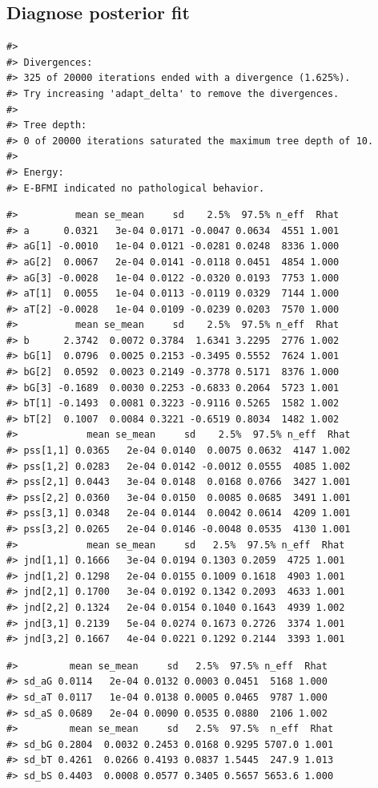 \documentclass[11pt, oneside, openany]{scrbook}
\begin{document}
\hypertarget{diagnose-posterior-fit}{%
\subsection{Diagnose posterior fit}\label{diagnose-posterior-fit}}

\begin{verbatim}
#> 
#> Divergences:
#> 325 of 20000 iterations ended with a divergence (1.625%).
#> Try increasing 'adapt_delta' to remove the divergences.
#> 
#> Tree depth:
#> 0 of 20000 iterations saturated the maximum tree depth of 10.
#> 
#> Energy:
#> E-BFMI indicated no pathological behavior.
\end{verbatim}

\begin{verbatim}
#>          mean se_mean     sd    2.5%  97.5% n_eff  Rhat
#> a      0.0321   3e-04 0.0171 -0.0047 0.0634  4551 1.001
#> aG[1] -0.0010   1e-04 0.0121 -0.0281 0.0248  8336 1.000
#> aG[2]  0.0067   2e-04 0.0141 -0.0118 0.0451  4854 1.000
#> aG[3] -0.0028   1e-04 0.0122 -0.0320 0.0193  7753 1.000
#> aT[1]  0.0055   1e-04 0.0113 -0.0119 0.0329  7144 1.000
#> aT[2] -0.0028   1e-04 0.0109 -0.0239 0.0203  7570 1.000
#>          mean se_mean     sd    2.5%  97.5% n_eff  Rhat
#> b      2.3742  0.0072 0.3784  1.6341 3.2295  2776 1.002
#> bG[1]  0.0796  0.0025 0.2153 -0.3495 0.5552  7624 1.001
#> bG[2]  0.0592  0.0023 0.2149 -0.3778 0.5171  8376 1.000
#> bG[3] -0.1689  0.0030 0.2253 -0.6833 0.2064  5723 1.001
#> bT[1] -0.1493  0.0081 0.3223 -0.9116 0.5265  1582 1.002
#> bT[2]  0.1007  0.0084 0.3221 -0.6519 0.8034  1482 1.002
#>            mean se_mean     sd    2.5%  97.5% n_eff  Rhat
#> pss[1,1] 0.0365   2e-04 0.0140  0.0075 0.0632  4147 1.002
#> pss[1,2] 0.0283   2e-04 0.0142 -0.0012 0.0555  4085 1.002
#> pss[2,1] 0.0443   3e-04 0.0148  0.0168 0.0766  3427 1.001
#> pss[2,2] 0.0360   3e-04 0.0150  0.0085 0.0685  3491 1.001
#> pss[3,1] 0.0348   2e-04 0.0144  0.0042 0.0614  4209 1.001
#> pss[3,2] 0.0265   2e-04 0.0146 -0.0048 0.0535  4130 1.001
#>            mean se_mean     sd   2.5%  97.5% n_eff  Rhat
#> jnd[1,1] 0.1666   3e-04 0.0194 0.1303 0.2059  4725 1.001
#> jnd[1,2] 0.1298   2e-04 0.0155 0.1009 0.1618  4903 1.001
#> jnd[2,1] 0.1700   3e-04 0.0192 0.1342 0.2093  4633 1.001
#> jnd[2,2] 0.1324   2e-04 0.0154 0.1040 0.1643  4939 1.002
#> jnd[3,1] 0.2139   5e-04 0.0274 0.1673 0.2726  3374 1.001
#> jnd[3,2] 0.1667   4e-04 0.0221 0.1292 0.2144  3393 1.001
\end{verbatim}

\begin{verbatim}
#>         mean se_mean     sd   2.5%  97.5% n_eff  Rhat
#> sd_aG 0.0114   2e-04 0.0132 0.0003 0.0451  5168 1.000
#> sd_aT 0.0117   1e-04 0.0138 0.0005 0.0465  9787 1.000
#> sd_aS 0.0689   2e-04 0.0090 0.0535 0.0880  2106 1.002
#>         mean se_mean     sd   2.5%  97.5%  n_eff  Rhat
#> sd_bG 0.2804  0.0032 0.2453 0.0168 0.9295 5707.0 1.001
#> sd_bT 0.4261  0.0266 0.4193 0.0837 1.5445  247.9 1.013
#> sd_bS 0.4403  0.0008 0.0577 0.3405 0.5657 5653.6 1.000
\end{verbatim}
\end{document}
